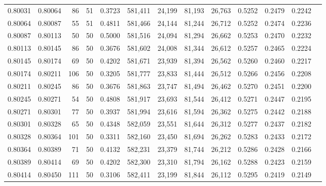 \begin{tabular}{rrrrrrrrrrrrr}
0.80031 & 0.80064 &    86 &  51 &                                     0.3723 & 581,411 &  24,199 &  81,193 &  26,763 & 0.5252 & 0.2479 & 0.2242 \\
0.80064 & 0.80087 &    55 &  51 &                                     0.4811 & 581,466 &  24,144 &  81,244 &  26,712 & 0.5252 & 0.2474 & 0.2236 \\
0.80087 & 0.80113 &    50 &  50 &                                     0.5000 & 581,516 &  24,094 &  81,294 &  26,662 & 0.5253 & 0.2470 & 0.2232 \\
0.80113 & 0.80145 &    86 &  50 &                                     0.3676 & 581,602 &  24,008 &  81,344 &  26,612 & 0.5257 & 0.2465 & 0.2224 \\
0.80145 & 0.80174 &    69 &  50 &                                     0.4202 & 581,671 &  23,939 &  81,394 &  26,562 & 0.5260 & 0.2460 & 0.2217 \\
0.80174 & 0.80211 &   106 &  50 &                                     0.3205 & 581,777 &  23,833 &  81,444 &  26,512 & 0.5266 & 0.2456 & 0.2208 \\
0.80211 & 0.80245 &    86 &  50 &                                     0.3676 & 581,863 &  23,747 &  81,494 &  26,462 & 0.5270 & 0.2451 & 0.2200 \\
0.80245 & 0.80271 &    54 &  50 &                                     0.4808 & 581,917 &  23,693 &  81,544 &  26,412 & 0.5271 & 0.2447 & 0.2195 \\
0.80271 & 0.80301 &    77 &  50 &                                     0.3937 & 581,994 &  23,616 &  81,594 &  26,362 & 0.5275 & 0.2442 & 0.2188 \\
0.80301 & 0.80328 &    65 &  50 &                                     0.4348 & 582,059 &  23,551 &  81,644 &  26,312 & 0.5277 & 0.2437 & 0.2182 \\
0.80328 & 0.80364 &   101 &  50 &                                     0.3311 & 582,160 &  23,450 &  81,694 &  26,262 & 0.5283 & 0.2433 & 0.2172 \\
0.80364 & 0.80389 &    71 &  50 &                                     0.4132 & 582,231 &  23,379 &  81,744 &  26,212 & 0.5286 & 0.2428 & 0.2166 \\
0.80389 & 0.80414 &    69 &  50 &                                     0.4202 & 582,300 &  23,310 &  81,794 &  26,162 & 0.5288 & 0.2423 & 0.2159 \\
0.80414 & 0.80450 &   111 &  50 &                                     0.3106 & 582,411 &  23,199 &  81,844 &  26,112 & 0.5295 & 0.2419 & 0.2149 \\

\end{tabular}

